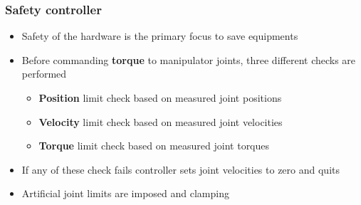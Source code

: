\documentclass{beamer}
\begin{document}
\begin{frame}
	\frametitle{Safety controller}
	\vspace{-0.5cm}
	\begin{itemize}
		\item Safety of the hardware is the primary focus to save equipments
		\item Before commanding \textbf{torque} to manipulator joints, three different checks are performed
		\begin{itemize}
			\item \textbf{Position }limit check based on measured joint positions
			\item \textbf{Velocity }limit check based on measured joint velocities
			\item \textbf{Torque }limit check based on measured joint torques
		\end{itemize}
		\item If any of these check fails controller sets joint velocities to zero and quits
		\item Artificial joint limits are imposed and clamping
	\end{itemize}
\end{frame}
\end{document}
